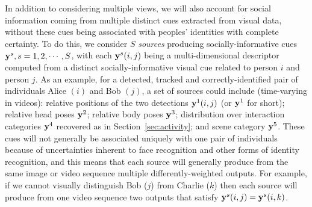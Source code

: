 In addition to considering multiple views, we will also account for social information coming from multiple distinct cues extracted from visual data, without these cues being associated with peoples' identities with complete certainty. To do this, we consider $S$ \emph{sources} producing socially-informative cues ${\bf y}^s, s=1,2,\cdots,S$, with each ${\bf y}^s(i,j)$ being a multi-dimensional descriptor computed from a distinct socially-informative visual cue related to person $i$ and person $j$. As an example, for a detected, tracked and correctly-identified pair of individuals Alice $(i)$ and Bob $(j)$, a set of sources could include (time-varying in videos): relative positions of the two detections ${\bf y}^1(i,j)$ (or ${\bf y}^1$ for short);  relative head poses ${\bf y}^2$; relative body poses ${\bf y}^3$; distribution over interaction categories ${\bf y}^4$ recovered as in Section~\ref{sec:activity}; and scene category ${\bf y}^5$. These cues will not generally be associated uniquely with one pair of individuals because of uncertainties inherent to face recognition and other forms of identity recognition, and this means that
each source will generally produce from the same image or video sequence multiple differently-weighted outputs. For example, if we cannot visually distinguish Bob ($j$) from Charlie ($k$) then each source will produce from one video sequence two outputs that satisfy ${\bf y}^s(i,j)={\bf y}^s(i,k)$. 

